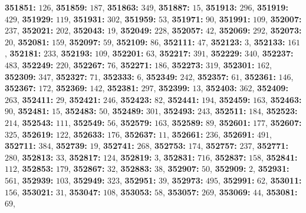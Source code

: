 \textsf{\bfseries 351851:} $126$, \textsf{\bfseries 351859:} $187$, \textsf{\bfseries 351863:} $349$, \textsf{\bfseries 351887:} $15$, \textsf{\bfseries 351913:} $296$, \textsf{\bfseries 351919:} $429$, \textsf{\bfseries 351929:} $119$, \textsf{\bfseries 351931:} $302$, \textsf{\bfseries 351959:} $53$, \textsf{\bfseries 351971:} $90$, \textsf{\bfseries 351991:} $109$, \textsf{\bfseries 352007:} $237$, \textsf{\bfseries 352021:} $202$, \textsf{\bfseries 352043:} $19$, \textsf{\bfseries 352049:} $228$, \textsf{\bfseries 352057:} $42$, \textsf{\bfseries 352069:} $292$, \textsf{\bfseries 352073:} $20$, \textsf{\bfseries 352081:} $159$, \textsf{\bfseries 352097:} $59$, \textsf{\bfseries 352109:} $86$, \textsf{\bfseries 352111:} $47$, \textsf{\bfseries 352123:} $3$, \textsf{\bfseries 352133:} $161$, \textsf{\bfseries 352181:} $233$, \textsf{\bfseries 352193:} $109$, \textsf{\bfseries 352201:} $63$, \textsf{\bfseries 352217:} $391$, \textsf{\bfseries 352229:} $340$, \textsf{\bfseries 352237:} $483$, \textsf{\bfseries 352249:} $220$, \textsf{\bfseries 352267:} $76$, \textsf{\bfseries 352271:} $186$, \textsf{\bfseries 352273:} $319$, \textsf{\bfseries 352301:} $162$, \textsf{\bfseries 352309:} $347$, \textsf{\bfseries 352327:} $71$, \textsf{\bfseries 352333:} $6$, \textsf{\bfseries 352349:} $242$, \textsf{\bfseries 352357:} $61$, \textsf{\bfseries 352361:} $146$, \textsf{\bfseries 352367:} $172$, \textsf{\bfseries 352369:} $142$, \textsf{\bfseries 352381:} $297$, \textsf{\bfseries 352399:} $13$, \textsf{\bfseries 352403:} $362$, \textsf{\bfseries 352409:} $263$, \textsf{\bfseries 352411:} $29$, \textsf{\bfseries 352421:} $246$, \textsf{\bfseries 352423:} $82$, \textsf{\bfseries 352441:} $194$, \textsf{\bfseries 352459:} $163$, \textsf{\bfseries 352463:} $90$, \textsf{\bfseries 352481:} $15$, \textsf{\bfseries 352483:} $50$, \textsf{\bfseries 352489:} $301$, \textsf{\bfseries 352493:} $243$, \textsf{\bfseries 352511:} $184$, \textsf{\bfseries 352523:} $214$, \textsf{\bfseries 352543:} $111$, \textsf{\bfseries 352549:} $56$, \textsf{\bfseries 352579:} $163$, \textsf{\bfseries 352589:} $89$, \textsf{\bfseries 352601:} $177$, \textsf{\bfseries 352607:} $325$, \textsf{\bfseries 352619:} $122$, \textsf{\bfseries 352633:} $176$, \textsf{\bfseries 352637:} $11$, \textsf{\bfseries 352661:} $236$, \textsf{\bfseries 352691:} $491$, \textsf{\bfseries 352711:} $384$, \textsf{\bfseries 352739:} $19$, \textsf{\bfseries 352741:} $268$, \textsf{\bfseries 352753:} $174$, \textsf{\bfseries 352757:} $237$, \textsf{\bfseries 352771:} $280$, \textsf{\bfseries 352813:} $33$, \textsf{\bfseries 352817:} $124$, \textsf{\bfseries 352819:} $3$, \textsf{\bfseries 352831:} $716$, \textsf{\bfseries 352837:} $158$, \textsf{\bfseries 352841:} $112$, \textsf{\bfseries 352853:} $179$, \textsf{\bfseries 352867:} $32$, \textsf{\bfseries 352883:} $38$, \textsf{\bfseries 352907:} $50$, \textsf{\bfseries 352909:} $2$, \textsf{\bfseries 352931:} $561$, \textsf{\bfseries 352939:} $103$, \textsf{\bfseries 352949:} $323$, \textsf{\bfseries 352951:} $39$, \textsf{\bfseries 352973:} $495$, \textsf{\bfseries 352991:} $62$, \textsf{\bfseries 353011:} $156$, \textsf{\bfseries 353021:} $31$, \textsf{\bfseries 353047:} $108$, \textsf{\bfseries 353053:} $58$, \textsf{\bfseries 353057:} $269$, \textsf{\bfseries 353069:} $44$, \textsf{\bfseries 353081:} $69$, 
